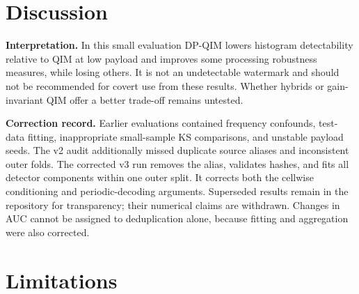 \documentclass[conference,10pt]{IEEEtran}
\begin{document}
\section{Discussion}
\label{sec:discussion}

\textbf{Interpretation.} In this small evaluation DP-QIM lowers histogram
detectability relative to QIM at low payload and improves some processing
robustness measures, while losing others. It is not an undetectable watermark
and should not be recommended for covert use from these results. Whether
hybrids or gain-invariant QIM offer a better trade-off remains untested.

\textbf{Correction record.} Earlier evaluations contained frequency confounds,
test-data fitting, inappropriate small-sample KS comparisons, and unstable
payload seeds. The v2 audit additionally missed duplicate source aliases and
inconsistent outer folds. The corrected v3 run removes the alias, validates
hashes, and fits all detector components within one outer split. It corrects
both the cellwise conditioning and periodic-decoding arguments. Superseded
results remain in the repository for transparency; their numerical claims
are withdrawn. Changes in AUC cannot be assigned to deduplication alone,
because fitting and aggregation were also corrected.

\section{Limitations}
\label{sec:limitations}
\end{document}
